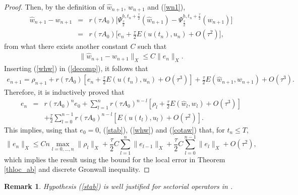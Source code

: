 \documentclass[a4paper,12pt]{article}
\newtheorem{remark}[theorem]{Remark}
\begin{document}
\begin{proof}
Then, by the definition of $\hat{w}_{n+1}$, $w_{n+1}$ and (\ref{wn1}),
\begin{eqnarray}
\hat{w}_{n+1}-w_{n+1}&=& r(\tau A_0)\big[ \Psi_{\frac{\tau}{2}}^{h,t_n+\frac{\tau}{2}}(\hat{w}_{n+1})-\Psi_{\frac{\tau}{2}}^{h,t_n+\frac{\tau}{2}}(w_{n+1}) \big] \nonumber \\
&=&r(\tau A_0)\big[e_n+\frac{\tau}{2}E(u(t_n),u_n)+O(\tau^2)\big], \label{whw}
\end{eqnarray}
from what there exists another constant $C$ such that
\begin{eqnarray}
\| \hat{w}_{n+1}-w_{n+1} \|_X \le C \|e_n\|_X.
\label{cotaw}
\end{eqnarray}
Inserting (\ref{whw}) in (\ref{decomp}), it follows that
\begin{eqnarray}
e_{n+1}=\rho_{n+1}+r(\tau A_0)[e_n+\frac{\tau}{2}E(u(t_n),u_n)+O(\tau^3)]+\frac{\tau}{2}E(\hat{w}_{n+1},w_{n+1})+O(\tau^3).
\nonumber
\end{eqnarray}
Therefore, it is inductively proved that
\begin{eqnarray}
e_n&=&r(\tau A_0)^n e_0+\sum_{l=1}^n r(\tau A_0)^{n-l} [\rho_l+\frac{\tau}{2}E(\hat{w}_l,w_l)+O(\tau^3)] \nonumber \\
&&+\frac{\tau}{2} \sum_{l=0}^{n-1} r(\tau A_0)^{n-l} [ E(u(t_l),u_l)+O(\tau^2)]. \nonumber
\end{eqnarray}
This implies, using that $e_0=0$, (\ref{stab}), (\ref{whw}) and (\ref{cotaw}) that, for $t_n \le T$,
$$
\|e_n\|_X \le C n \max_{l=0,\dots,n} \|\rho_l\|_X + \frac{\tau}{2} C \sum_{l=1}^n \|e_{l-1}\|_X+\frac{\tau}{2} C \sum_{l=0}^{n-1} \|e_l\|_X+O(\tau^2),$$
which implies the result using the bound for the local error in Theorem \ref{thloc_ab} and discrete Gronwall inequality.
\end{proof}

\begin{remark} Hypothesis (\ref{stab}) is well justified for sectorial operators in \cite{P}.
\end{remark}
\end{document}
